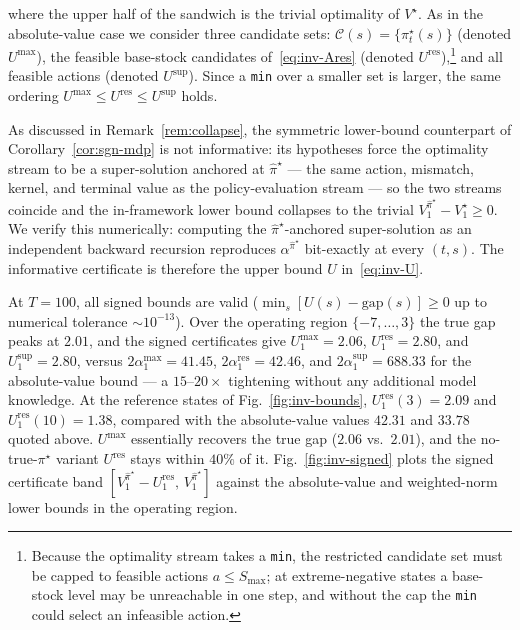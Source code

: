 \documentclass[10pt]{article}
\theoremstyle{definition}
\begin{document}
where the upper half of the sandwich is the trivial optimality of
$V^\star$. As in the absolute-value case we consider three candidate
sets: $\mathcal{C}(s) = \{\pi^\star_t(s)\}$ (denoted $U^{\max}$), the
feasible base-stock candidates of~\eqref{eq:inv-Ares} (denoted
$U^{\mathrm{res}}$),\footnote{Because the optimality stream takes a
\texttt{min}, the restricted candidate set must be capped to feasible
actions $a \le S_{\max}$; at extreme-negative states a base-stock level
may be unreachable in one step, and without the cap the \texttt{min}
could select an infeasible action.} and all feasible actions (denoted
$U^{\sup}$). Since a \texttt{min} over a smaller set is larger, the
same ordering $U^{\max} \le U^{\mathrm{res}} \le U^{\sup}$ holds.

As discussed in Remark~\ref{rem:collapse}, the symmetric lower-bound
counterpart of Corollary~\ref{cor:sgn-mdp} is not informative: its
hypotheses force the optimality stream to be a super-solution anchored
at $\hat\pi^\star$ --- the same action, mismatch, kernel, and terminal
value as the policy-evaluation stream --- so the two streams coincide
and the in-framework lower bound collapses to the trivial
$V^{\hat\pi^\star}_1 - V^\star_1 \ge 0$. We verify this numerically:
computing the $\hat\pi^\star$-anchored super-solution as an independent
backward recursion reproduces $\alpha^{\hat\pi^\star}$ bit-exactly at
every $(t,s)$. The informative certificate is therefore the upper bound
$U$ in~\eqref{eq:inv-U}.

At $T = 100$, all signed bounds are valid
($\min_s [U(s) - \mathrm{gap}(s)] \ge 0$ up to numerical tolerance
$\sim 10^{-13}$). Over the operating region $\{-7, \dots, 3\}$ the true
gap peaks at $2.01$, and the signed certificates give
$U^{\max}_1 = 2.06$, $U^{\mathrm{res}}_1 = 2.80$, and
$U^{\sup}_1 = 2.80$, versus $2\alpha^{\max}_1 = 41.45$,
$2\alpha^{\mathrm{res}}_1 = 42.46$, and $2\alpha^{\sup}_1 = 688.33$ for
the absolute-value bound --- a $15$--$20\times$ tightening without any
additional model knowledge. At the reference states of
Fig.~\ref{fig:inv-bounds}, $U^{\mathrm{res}}_1(3) = 2.09$ and
$U^{\mathrm{res}}_1(10) = 1.38$, compared with the absolute-value
values $42.31$ and $33.78$ quoted above. $U^{\max}$ essentially
recovers the true gap ($2.06$ vs.\ $2.01$), and the
no-true-$\pi^\star$ variant $U^{\mathrm{res}}$ stays within $40\%$ of
it. Fig.~\ref{fig:inv-signed} plots the signed certificate band
$[V^{\hat\pi^\star}_1 - U^{\mathrm{res}}_1,\, V^{\hat\pi^\star}_1]$
against the absolute-value and weighted-norm lower bounds in the
operating region.
\end{document}
